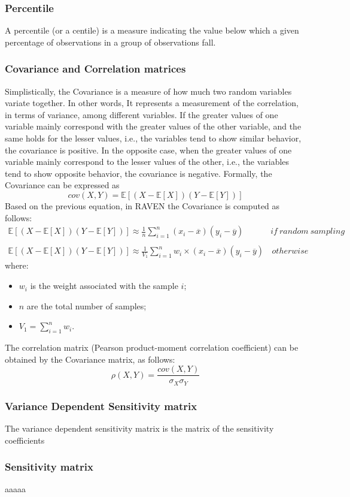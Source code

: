 \subsubsection{Percentile}
A percentile (or a centile) is a measure indicating the value below which a given percentage of observations in a group of observations fall. 

\subsubsection{Covariance and Correlation matrices}
Simplistically, the Covariance is a measure of how much two random variables variate together. In other words, It represents a 
measurement of the correlation, in terms of variance,  among different variables. If the greater values of one variable mainly 
correspond with the greater values of the other variable, and the same holds for the lesser values, i.e., the variables tend to show 
similar behavior, the covariance is positive. In the opposite case, when the greater values of one variable mainly correspond to the 
lesser values of the other, i.e., the variables tend to show opposite behavior, the covariance is negative. 
Formally, the Covariance can be expressed as
\begin{equation}
 cov(X,Y) = \mathbb{E} \left [ \left ( X- \mathbb{E}\left [ X \right ] \right ) \left ( Y- \mathbb{E}\left [ Y \right ] \right )\right ]
\end{equation}
Based on the previous equation, in RAVEN the Covariance is computed as follows:
\begin{equation}
\begin{matrix}
 \mathbb{E} \left [ \left ( X- \mathbb{E}\left [ X \right ] \right ) \left ( Y- \mathbb{E}\left [ Y \right ] \right )\right ] \approx
 \frac{1}{n}\sum_{i=1}^{n} (x_{i} - \overline{x})(y_{i} - \overline{y})  & if \: random \: sampling  
\\
\\
 \mathbb{E} \left [ \left ( X- \mathbb{E}\left [ X \right ] \right ) \left ( Y- \mathbb{E}\left [ Y \right ] \right )\right ] \approx
\frac{1}{V_{1}} \sum_{i=1}^{n} w_{i} \times (x_{i} - \overline{x})(y_{i} - \overline{y}) &  \, otherwise
\end{matrix}
\end{equation}
where:
\begin{itemize}
  \item $w_{i}$ is the weight associated with the sample $i$;
  \item $n$ are the total number of samples;
  \item $V_{1} = \sum_{i=1}^{n} w_{i}$.
\end{itemize}
The correlation matrix (Pearson product-moment correlation coefficient) can be obtained by the Covariance matrix, as follows:
\begin{equation}
\rho(X,Y) = \frac{cov(X,Y)}{\sigma_{X}\sigma_{Y}}
\end{equation}
\subsubsection{Variance Dependent Sensitivity matrix}
The variance dependent sensitivity matrix is the matrix of the sensitivity coefficients 

\subsubsection{Sensitivity matrix}


aaaaa